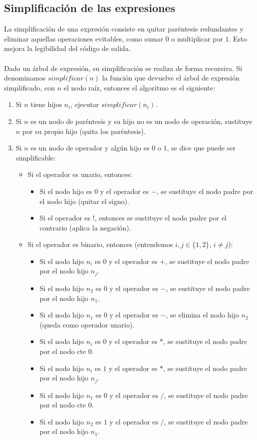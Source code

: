 \subsection*{Simplificación de las expresiones}
La simplificación de una expresión consiste en quitar paréntesis redundantes y eliminar aquellas operaciones evitables, como sumar $0$ o multiplicar por $1$. Esto mejora la legibilidad del código de salida.\\
\\Dado un árbol de expresión, su simplificación se realiza de forma recursiva. Si denominamos $simplificar(n)$ la función que devuelve el árbol de expresión simplificado, con $n$ el nodo raíz, entonces el algoritmo es el siguiente:
\begin{enumerate}
	\item Si $n$ tiene hijos $n_i$, ejecutar $simplificar(n_i)$.
	\item Si $n$ es un nodo de paréntesis y su hijo no es un nodo de operación, sustituye $n$ por su propio hijo (quita los paréntesis).
	\item Si $n$ es un nodo de operador y algún hijo es $0$ o $1$, se dice que puede ser simplificable:
	\begin{itemize}
		\item Si el operador es unario, entonces:
		\begin{itemize}
			\item Si el nodo hijo es $0$ y el operador es $-$, se sustituye el nodo padre por el nodo hijo (quitar el signo).
			\item Si el operador es !, entonces se sustituye el nodo padre por el contrario (aplica la negación).
		\end{itemize}
		\item Si el operador es binario, entonces (entendemos $i,j \in \{1,2\}$, $i \neq j$):
		\begin{itemize}
			\item Si el nodo hijo $n_i$ es $0$ y el operador es $+$, se sustituye el nodo padre por el nodo hijo $n_j$.
			\item Si el nodo hijo $n_2$ es $0$ y el operador es $-$, se sustituye el nodo padre por el nodo hijo $n_1$.
			\item Si el nodo hijo $n_1$ es $0$ y el operador es $-$, se elimina el nodo hijo $n_2$ (queda como operador unario).
			\item Si el nodo hijo $n_i$ es $0$ y el operador es $*$, se sustituye el nodo padre por el nodo cte $0$.
			\item Si el nodo hijo $n_i$ es $1$ y el operador es $*$, se sustituye el nodo padre por el nodo hijo $n_j$.
			\item Si el nodo hijo $n_1$ es $0$ y el operador es $/$, se sustituye el nodo padre por el nodo cte $0$.
			\item Si el nodo hijo $n_2$ es $1$ y el operador es $/$, se sustituye el nodo padre por el nodo hijo $n_1$.
		\end{itemize}
	\end{itemize}
\end{enumerate}

